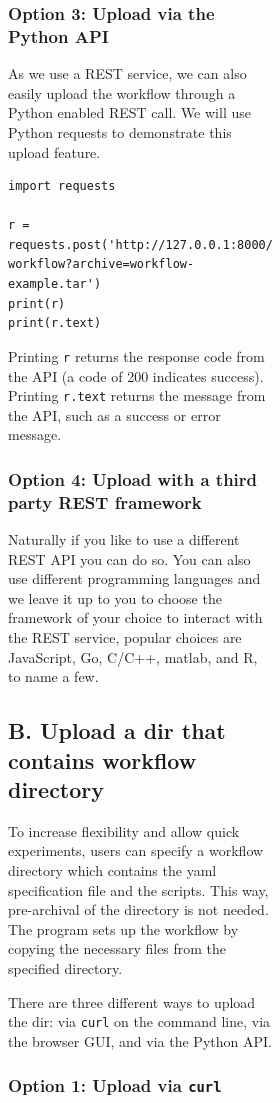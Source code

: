\begin{figure}[htb]
\begin{figure}[htb]
\begin{figure}[htb]
\subsubsection{Option 3: Upload via the Python
API}\label{option-3-upload-via-the-python-api}

As we use a REST service, we can also easily upload the workflow through
a Python enabled REST call. We will use Python requests to demonstrate
this upload feature.

\smallskip
\begin{verbatim}
import requests

r = requests.post('http://127.0.0.1:8000/ workflow?archive=workflow-example.tar')
print(r)
print(r.text)
\end{verbatim}
\smallskip

Printing \texttt{r} returns the response code from the API (a code of
200 indicates success). Printing \texttt{r.text} returns the message
from the API, such as a success or error message.

\subsubsection{Option 4: Upload with a third party REST
framework}\label{option-4-upload-with-a-third-party-rest-framework}

Naturally if you like to use a different REST API you can do so. You can
also use different programming languages and we leave it up to you to
choose the framework of your choice to interact with the REST service,
popular choices are JavaScript, Go, C/C++, matlab, and R, to name a few.

\subsection{B. Upload a dir that contains workflow
directory}\label{b.-upload-a-dir-that-contains-workflow-directory}

To increase flexibility and allow quick experiments, users can specify a
workflow directory which contains the yaml specification file and the
scripts. This way, pre-archival of the directory is not needed. The
program sets up the workflow by copying the necessary files from the
specified directory.

There are three different ways to upload the dir: via \texttt{curl} on
the command line, via the browser GUI, and via the Python API.

\subsubsection{\texorpdfstring{Option 1: Upload via
\texttt{curl}}{Option 1: Upload via curl}}\label{option-1-upload-via-curl-1}


\end{figure}
\end{figure}
\end{figure}
